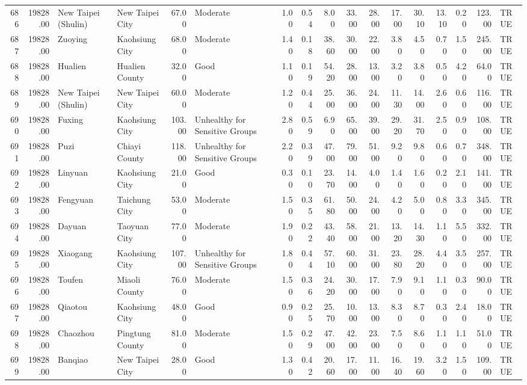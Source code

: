 \begin{table}[ht]
\begin{tabular}{rrllrlrrrrrrrrrrl}
  686 & 19828.00 & New Taipei (Shulin) & New Taipei City & 67.00 & Moderate & 1.00 & 0.54 & 8.00 & 33.00 & 28.00 & 17.00 & 30.10 & 13.10 & 0.20 & 123.00 & TRUE \\ 
  687 & 19828.00 & Zuoying & Kaohsiung City & 68.00 & Moderate & 1.40 & 0.18 & 38.60 & 30.00 & 22.00 & 3.80 & 4.50 & 0.70 & 1.50 & 245.00 & TRUE \\ 
  688 & 19828.00 & Hualien & Hualien County & 32.00 & Good & 1.10 & 0.19 & 54.20 & 28.00 & 13.00 & 3.20 & 3.80 & 0.50 & 4.20 & 64.00 & TRUE \\ 
  689 & 19828.00 & New Taipei (Shulin) & New Taipei City & 60.00 & Moderate & 1.20 & 0.44 & 25.00 & 36.00 & 24.00 & 11.30 & 14.00 & 2.60 & 0.60 & 116.00 & TRUE \\ 
  690 & 19828.00 & Fuxing & Kaohsiung City & 103.00 & Unhealthy for Sensitive Groups & 2.80 & 0.59 & 6.90 & 65.00 & 39.00 & 29.20 & 31.70 & 2.50 & 0.90 & 108.00 & TRUE \\ 
  691 & 19828.00 & Puzi & Chiayi County & 118.00 & Unhealthy for Sensitive Groups & 2.20 & 0.39 & 47.00 & 79.00 & 51.00 & 9.20 & 9.80 & 0.60 & 0.70 & 348.00 & TRUE \\ 
  692 & 19828.00 & Linyuan & Kaohsiung City & 21.00 & Good & 0.30 & 0.10 & 23.70 & 14.00 & 4.00 & 1.40 & 1.60 & 0.20 & 2.10 & 141.00 & TRUE \\ 
  693 & 19828.00 & Fengyuan & Taichung City & 53.00 & Moderate & 1.50 & 0.35 & 61.80 & 50.00 & 24.00 & 4.20 & 5.00 & 0.80 & 3.30 & 345.00 & TRUE \\ 
  694 & 19828.00 & Dayuan & Taoyuan City & 77.00 & Moderate & 1.90 & 0.22 & 43.40 & 58.00 & 21.00 & 13.20 & 14.30 & 1.10 & 5.50 & 332.00 & TRUE \\ 
  695 & 19828.00 & Xiaogang & Kaohsiung City & 107.00 & Unhealthy for Sensitive Groups & 1.80 & 0.44 & 57.10 & 60.00 & 31.00 & 23.80 & 28.20 & 4.40 & 3.50 & 257.00 & TRUE \\ 
  696 & 19828.00 & Toufen & Miaoli County & 76.00 & Moderate & 1.50 & 0.36 & 24.20 & 30.00 & 17.00 & 7.90 & 9.10 & 1.10 & 0.30 & 90.00 & TRUE \\ 
  697 & 19828.00 & Qiaotou & Kaohsiung City & 48.00 & Good & 0.90 & 0.25 & 25.70 & 10.00 & 13.00 & 8.30 & 8.70 & 0.30 & 2.40 & 18.00 & TRUE \\ 
  698 & 19828.00 & Chaozhou & Pingtung County & 81.00 & Moderate & 1.50 & 0.29 & 47.00 & 42.00 & 23.00 & 7.50 & 8.60 & 1.10 & 1.10 & 51.00 & TRUE \\ 
  699 & 19828.00 & Banqiao & New Taipei City & 28.00 & Good & 1.30 & 0.42 & 20.60 & 17.00 & 11.00 & 16.40 & 19.60 & 3.20 & 1.50 & 109.00 & TRUE \\ 

\end{tabular}
\end{table}
